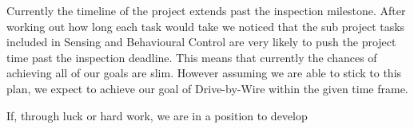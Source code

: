 Currently the timeline of the project extends past the inspection milestone.
After working out how long each task would take we noticed that the sub project
tasks included in Sensing and Behavioural Control are very likely to push the
project time past the inspection deadline. This means that currently the chances
of achieving all of our goals are slim. However assuming we are able to stick to 
this plan, we expect to achieve our goal of Drive-by-Wire within the given
time frame.

If, through luck or hard work, we are in a position to develop 

